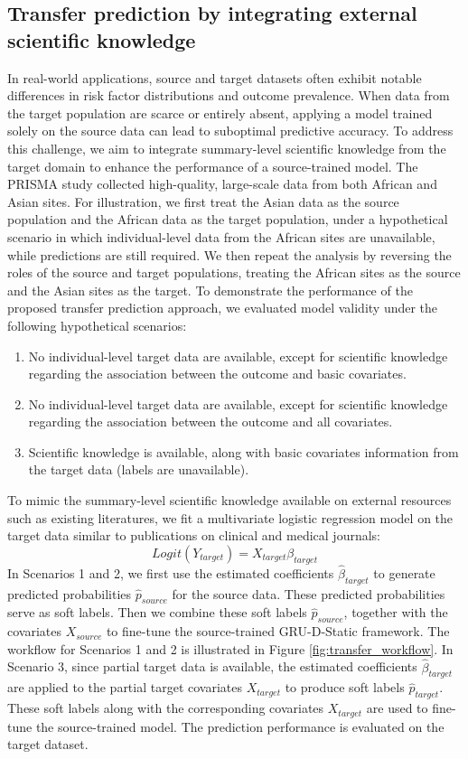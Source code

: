 \documentclass[fleqn,10pt]{wlscirep}
\begin{document}
\subsection*{Transfer prediction by integrating external scientific knowledge}
In real-world applications, source and target datasets often exhibit notable differences in risk factor distributions and outcome prevalence. When data from the target population are scarce or entirely absent, applying a model trained solely on the source data can lead to suboptimal predictive accuracy\cite{hosna2022transfer}. To address this challenge, we aim to integrate summary-level scientific knowledge from the target domain to enhance the performance of a source-trained model. The PRISMA study collected high-quality, large-scale data from both African and Asian sites. For illustration, we first treat the Asian data as the source population and the African data as the target population, under a hypothetical scenario in which individual-level data from the African sites are unavailable, while predictions are still required. We then repeat the analysis by reversing the roles of the source and target populations, treating the African sites as the source and the Asian sites as the target. To demonstrate the performance of the proposed transfer prediction approach, we evaluated model validity under the following hypothetical scenarios:
\begin{enumerate}
\item No individual-level target data are available, except for scientific knowledge regarding the association between the outcome and basic covariates.
\item No individual-level target data are available, except for scientific knowledge regarding the association between the outcome and all covariates.
\item Scientific knowledge is available, along with basic covariates information from the target data (labels are unavailable).
\end{enumerate}
To mimic the summary-level scientific knowledge available on external resources such as existing literatures, we fit a multivariate logistic regression model on the target data similar to publications on clinical and medical journals:
$$
Logit(Y_{target})=X_{target}\beta_{target}
$$ 
In Scenarios 1 and 2, we first use the estimated coefficients $\hat{\beta}_{target}$ to generate predicted probabilities $\hat{p}_{source}$ for the source data. These predicted probabilities serve as soft labels. Then we combine these soft labels $\hat{p}_{source}$, together with the covariates $X_{source}$ to fine-tune the source-trained GRU-D-Static framework. The workflow for Scenarios 1 and 2 is illustrated in Figure \ref{fig:transfer_workflow}. In Scenario 3, since partial target data is available, the estimated coefficients $\hat{\beta}_{target}$ are applied to the partial target covariates $X_{target}$ to produce soft labels $\hat{p}_{target}$. These soft labels along with the corresponding covariates $X_{target}$ are used to fine-tune the source-trained model. The prediction performance is evaluated on the target dataset.
\end{document}
